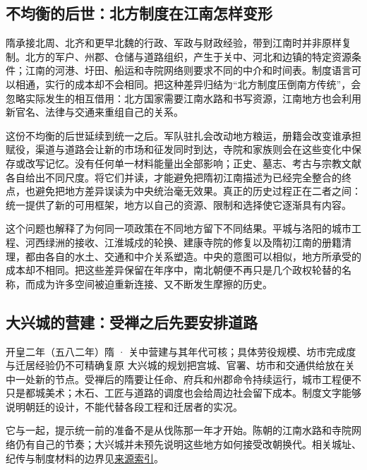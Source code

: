 \subsection{不均衡的后世：北方制度在江南怎样变形}

隋承接北周、北齐和更早北魏的行政、军政与财政经验，带到江南时并非原样复制。北方的军户、州郡、仓储与道路组织，产生于关中、河北和边镇的特定资源条件；江南的河港、圩田、船运和寺院网络则要求不同的中介和时间表。制度语言可以相通，实行的成本却不会相同。把这种差异归结为“北方制度压倒南方传统”，会忽略实际发生的相互借用：北方国家需要江南水路和书写资源，江南地方也会利用新官名、法律与交通来重组自己的关系。

这份不均衡的后世延续到统一之后。军队驻扎会改动地方粮运，册籍会改变谁承担赋役，渠道与道路会让新的市场和征发同时到达，寺院和家族则会在这些变化中保存或改写记忆。没有任何单一材料能量出全部影响；正史、墓志、考古与宗教文献各自给出不同尺度。将它们并读，才能避免把隋初江南描述为已经完全整合的终点，也避免把地方差异误读为中央统治毫无效果。真正的历史过程正在二者之间：统一提供了新的可用框架，地方以自己的资源、限制和选择使它逐渐具有内容。

这个问题也解释了为何同一项政策在不同地方留下不同结果。平城与洛阳的城市工程、河西绿洲的接收、江淮城戍的轮换、建康寺院的修复以及隋初江南的册籍清理，都由各自的水土、交通和中介关系塑造。中央的意图可以相似，地方所承受的成本却不相同。把这些差异保留在年序中，南北朝便不再只是几个政权轮替的名称，而成为许多空间被迫重新连接、又不断发生摩擦的历史。

\subsection{大兴城的营建：受禅之后先要安排道路}
\begin{event}{}{开皇二年（五八二年）}{隋 · 关中}{营建与其年代可核；具体劳役规模、坊市完成度与迁居经验仍不可精确复原}
大兴城的规划把宫城、官署、坊市和交通供给放在关中一处新的节点。受禅后的隋要让任命、府兵和州郡命令持续运行，城市工程便不只是都城美术；木石、工匠与道路的调度也会给周边社会留下成本。制度文字能够说明朝廷的设计，不能代替各段工程和迁居者的实况。

它与一起，提示统一前的准备不是从伐陈那一年才开始。陈朝的江南水路和寺院网络仍有自己的节奏；大兴城并未预先说明这些地方如何接受改朝换代。相关城址、纪传与制度材料的边界见\hyperref[app:sources]{来源索引}。
\end{event}

